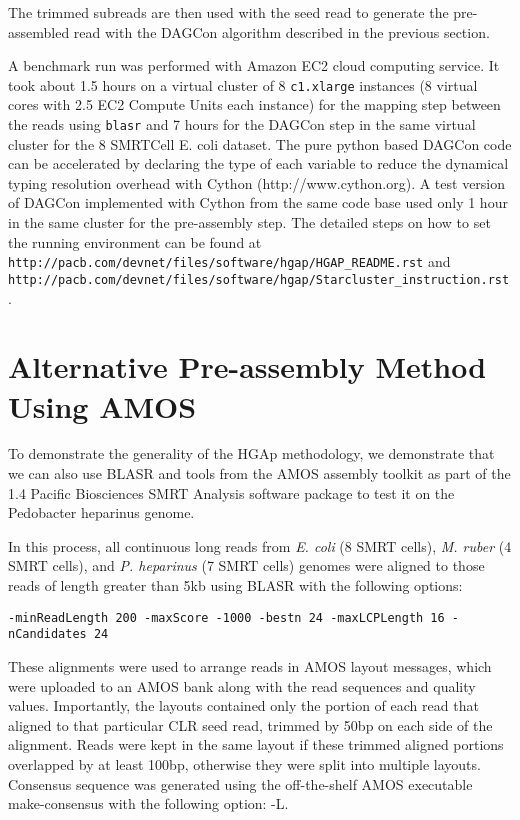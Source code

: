 \documentclass[11pt]{article}
\begin{document}
The trimmed subreads are then used with the seed read to generate the pre-assembled read with the DAGCon algorithm described in the previous section.

A benchmark run was performed with Amazon EC2 cloud computing service. It took about 1.5 hours on a virtual cluster of 8 {\tt c1.xlarge} instances (8 virtual cores with 2.5 EC2 Compute Units each instance) for the mapping step between the reads using {\tt blasr} and 7 hours for the DAGCon step in the same virtual cluster for the 8 SMRTCell E. coli dataset.  The pure python based DAGCon code can be accelerated by declaring the type of each variable to reduce the dynamical typing resolution overhead with Cython (http://www.cython.org).  A test version of DAGCon implemented with Cython from the same code base used only 1 hour in the same cluster for the pre-assembly step.
The detailed steps on how to set the running environment can be found at \\
{\tt http://pacb.com/devnet/files/software/hgap/HGAP\_README.rst} and \\
{\tt http://pacb.com/devnet/files/software/hgap/Starcluster\_instruction.rst}.

\section{Alternative Pre-assembly Method Using AMOS}

To demonstrate the generality of the HGAp methodology, we demonstrate that we can also use BLASR and tools from the AMOS assembly toolkit as part of the 1.4 Pacific Biosciences SMRT Analysis software package to test it on the Pedobacter heparinus genome. 

In this process, all continuous long reads from {\it E. coli} (8 SMRT cells),  {\it M. ruber} (4 SMRT cells), and {\it P. heparinus} (7 SMRT cells) genomes were aligned to those reads of length greater than 5kb using BLASR with the following options:  

\begin{verbatim}
-minReadLength 200 -maxScore -1000 -bestn 24 -maxLCPLength 16 -nCandidates 24
\end{verbatim}

These alignments were used to arrange reads in AMOS layout messages, which were uploaded to an AMOS bank along with the read sequences and quality values. Importantly, the layouts contained only the portion of each read that aligned to that particular CLR seed read, trimmed by 50bp on each side of the alignment. Reads were kept in the same layout if these trimmed aligned portions overlapped by at least 100bp, otherwise they were split into multiple layouts. Consensus sequence was generated using the off-the-shelf AMOS executable make-consensus with the following option: -L.
\end{document}
